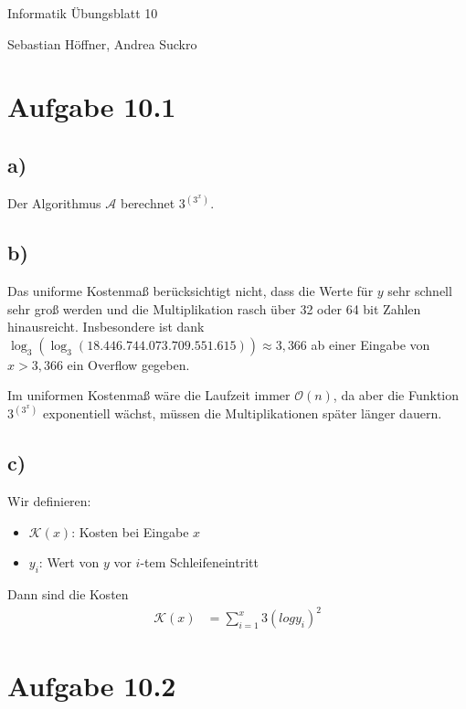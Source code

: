 \documentclass{article}
\begin{document}
\begin{center}
  \Large{Informatik \raisebox{0.05em}{:} Übungsblatt 10}

  \large{Sebastian Höffner, Andrea Suckro}
\end{center}



\section*{Aufgabe 10.1}
\subsection*{a)}
Der Algorithmus $\mathcal{A}$ berechnet $3^{\left(3^x\right)}$.


\subsection*{b)}
Das uniforme Kostenmaß berücksichtigt nicht, dass die Werte für $y$ sehr schnell sehr groß werden und die Multiplikation rasch über 32 oder 64 bit Zahlen hinausreicht.
Insbesondere ist dank $\log_3(\log_3(18.446.744.073.709.551.615)) \approx 3,366$ ab einer Eingabe von $x > 3,366$ ein Overflow gegeben.

Im uniformen Kostenmaß wäre die Laufzeit immer $\mathcal{O}(n)$, da aber die Funktion $3^{\left(3^x\right)}$ exponentiell wächst, müssen die Multiplikationen später länger dauern.


\subsection*{c)}
Wir definieren:
\begin{itemize}
	\item $\mathcal{K}(x)$: Kosten bei Eingabe $x$
	\item $y_i$: Wert von $y$ vor $i$-tem Schleifeneintritt
\end{itemize}

Dann sind die Kosten
\begin{align*}
\mathcal{K}(x) &= \sum\limits_{i=1}^x 3 \left(log y_i\right)^2
\end{align*}
 


\section*{Aufgabe 10.2}
\end{document}
